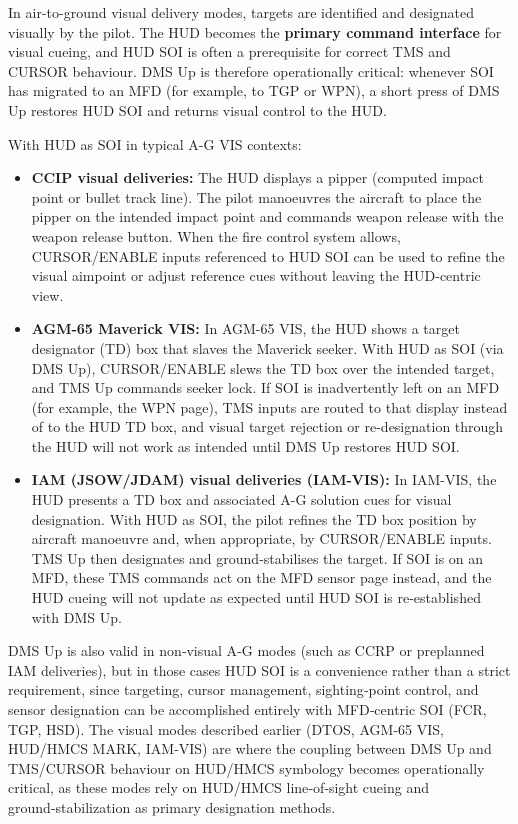 \documentclass[11pt,a4paper]{article}
\begin{document}
In air-to-ground visual delivery modes, targets are identified and designated visually by the pilot. The HUD becomes the \textbf{primary command interface} for visual cueing, and HUD SOI is often a prerequisite for correct TMS and CURSOR behaviour. DMS Up is therefore operationally critical: whenever SOI has migrated to an MFD (for example, to TGP or WPN), a short press of DMS Up restores HUD SOI and returns visual control to the HUD.

With HUD as SOI in typical A-G VIS contexts:

\begin{itemize}
  \item \textbf{CCIP visual deliveries:} The HUD displays a pipper (computed impact point or bullet track line). The pilot manoeuvres the aircraft to place the pipper on the intended impact point and commands weapon release with the weapon release button. When the fire control system allows, CURSOR/ENABLE inputs referenced to HUD SOI can be used to refine the visual aimpoint or adjust reference cues without leaving the HUD-centric view.
  \item \textbf{AGM-65 Maverick VIS:} In AGM-65 VIS, the HUD shows a target designator (TD) box that slaves the Maverick seeker. With HUD as SOI (via DMS Up), CURSOR/ENABLE slews the TD box over the intended target, and TMS Up commands seeker lock. If SOI is inadvertently left on an MFD (for example, the WPN page), TMS inputs are routed to that display instead of to the HUD TD box, and visual target rejection or re-designation through the HUD will not work as intended until DMS Up restores HUD SOI.
  \item \textbf{IAM (JSOW/JDAM) visual deliveries (IAM-VIS):} In IAM-VIS, the HUD presents a TD box and associated A-G solution cues for visual designation. With HUD as SOI, the pilot refines the TD box position by aircraft manoeuvre and, when appropriate, by CURSOR/ENABLE inputs. TMS Up then designates and ground-stabilises the target. If SOI is on an MFD, these TMS commands act on the MFD sensor page instead, and the HUD cueing will not update as expected until HUD SOI is re-established with DMS Up.
\end{itemize}

DMS Up is also valid in non‑visual A‑G modes (such as CCRP or preplanned IAM deliveries), but in those cases HUD SOI is a convenience rather than a strict requirement, since targeting, cursor management, sighting‑point control, and sensor designation can be accomplished entirely with MFD‑centric SOI (FCR, TGP, HSD). The visual modes described earlier (DTOS, AGM‑65 VIS, HUD/HMCS MARK, IAM‑VIS) are where the coupling between DMS Up and TMS/CURSOR behaviour on HUD/HMCS symbology becomes operationally critical, as these modes rely on HUD/HMCS line‑of‑sight cueing and ground‑stabilization as primary designation methods.
\end{document}
